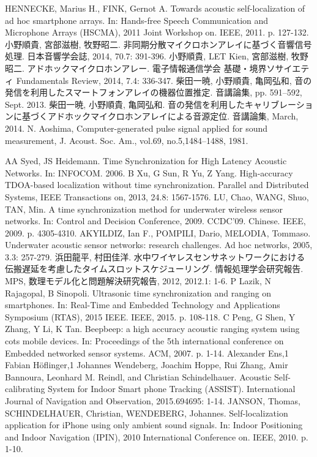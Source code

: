 \begin{thebibliography}{99}
 HENNECKE, Marius H., FINK, Gernot A. Towards acoustic self-localization of ad hoc smartphone arrays. In: Hands-free Speech Communication and Microphone Arrays (HSCMA), 2011 Joint Workshop on. IEEE, 2011. p. 127-132.
 小野順貴, 宮部滋樹, 牧野昭二. 非同期分散マイクロホンアレイに基づく音響信号処理. 日本音響学会誌, 2014, 70.7: 391-396.
 小野順貴, LET Kien, 宮部滋樹, 牧野昭二. アドホックマイクロホンアレー. 電子情報通信学会 基礎・境界ソサイエティ Fundamentals Review, 2014, 7.4: 336-347.
 柴田一暁, 小野順貴, 亀岡弘和, 音の発信を利用したスマートフォンアレイの機器位置推定. 音講論集, pp. 591–592, Sept. 2013.
 柴田一暁, 小野順貴, 亀岡弘和. 音の発信を利用したキャリブレーションに基づくアドホックマイクロホンアレイによる音源定位. 音講論集, March, 2014.
   N. Aoshima, Computer-generated pulse signal applied for sound measurement, J. Acoust. Soc. Am., vol.69, no.5,1484--1488, 1981.

 AA Syed, JS Heidemann. Time Synchronization for High Latency Acoustic Networks. In: INFOCOM. 2006.
 B Xu, G Sun, R Yu, Z Yang. High-accuracy TDOA-based localization without time synchronization. Parallel and Distributed Systems, IEEE Transactions on, 2013, 24.8: 1567-1576.
 LU, Chao, WANG, Shuo, TAN, Min. A time synchronization method for underwater wireless sensor networks. In: Control and Decision Conference, 2009. CCDC'09. Chinese. IEEE, 2009. p. 4305-4310.
 AKYILDIZ, Ian F., POMPILI, Dario, MELODIA, Tommaso. Underwater acoustic sensor networks: research challenges. Ad hoc networks, 2005, 3.3: 257-279.
 浜田龍平, 村田佳洋. 水中ワイヤレスセンサネットワークにおける伝搬遅延を考慮したタイムスロットスケジューリング. 情報処理学会研究報告. MPS, 数理モデル化と問題解決研究報告, 2012, 2012.1: 1-6.
 P Lazik, N Rajagopal, B Sinopoli. Ultrasonic time synchronization and ranging on smartphones. In: Real-Time and Embedded Technology and Applications Symposium (RTAS), 2015 IEEE. IEEE, 2015. p. 108-118.
 C Peng, G Shen, Y Zhang, Y Li, K Tan. Beepbeep: a high accuracy acoustic ranging system using cots mobile devices. In: Proceedings of the 5th international conference on Embedded networked sensor systems. ACM, 2007. p. 1-14.
 Alexander Ens,1 Fabian Höflinger,1 Johannes Wendeberg, Joachim Hoppe, Rui Zhang, Amir Bannoura, Leonhard M. Reindl, and Christian Schindelhauer. Acoustic Self-calibrating System for Indoor Smart phone Tracking (ASSIST). International Journal of Navigation and Observation, 2015.694695: 1-14.
 JANSON, Thomas, SCHINDELHAUER, Christian, WENDEBERG, Johannes. Self-localization application for iPhone using only ambient sound signals. In: Indoor Positioning and Indoor Navigation (IPIN), 2010 International Conference on. IEEE, 2010. p. 1-10.


\end{thebibliography}
